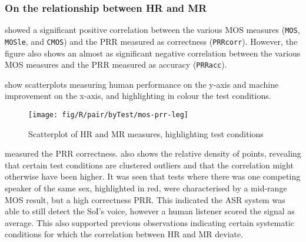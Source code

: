 \subsubsection*{On the relationship between \acl{HR} and \acl{MR}}

 showed a significant positive correlation between
the various \ac{MOS} measures (\lstinline!MOS!, \lstinline!MOSle!,
and \lstinline!CMOS!) and the \ac{PRR} measured as correctness (\lstinline!PRRcorr!).
However, the figure also shows an almost as significant negative correlation
between the various \ac{MOS} measures and the \ac{PRR} measured
as accuracy (\lstinline!PRRacc!).

 show scatterplots measuring human performance on the
y-axis and machine improvement on the x-axis, and highlighting in
colour the test conditions.

\begin{figure}[h]


\noindent \begin{centering}
\texttt{[image: fig/R/pair/byTest/mos-prr-leg]}
\par\end{centering}

\protect\caption{\label{fig:hr-mr}Scatterplot of \acs{HR} and \acs{MR} measures,
highlighting test conditions}
\end{figure}


 measured the \ac{PRR}
correctness.  also shows the relative density
of points, revealing that certain test conditions are clustered outliers
and that the correlation might otherwise have been higher. It was
seen that tests where there was one competing speaker of the same
sex, highlighted in red, were characterised by a mid-range \ac{MOS}
result, but a high correctness \ac{PRR}. This indicated the \ac{ASR}
system was able to still detect the \ac{SoI}'s voice, however a human
listener scored the signal as average. This also supported previous
observations indicating certain systematic conditions for which the
correlation between \ac{HR} and \ac{MR} deviate.

